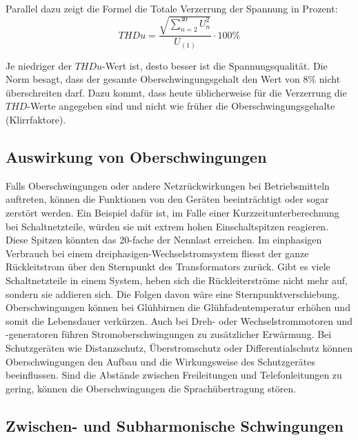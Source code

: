 Parallel dazu zeigt die Formel die Totale Verzerrung der Spannung in Prozent:
\begin{equation}\label{eq:THDu}
THDu = \frac{\sqrt{\sum_{n=2}^{40} U_n^2}}{U_{(1)}} \cdot 100\%
\end{equation}


Je niedriger der $THDu$-Wert ist, desto besser ist die Spannungsqualität. Die Norm besagt, dass der gesamte Oberschwingungsgehalt den Wert von 8\% nicht überschreiten darf. Dazu kommt, dass heute üblicherweise für die Verzerrung die $THD$-Werte angegeben sind und nicht wie früher die Oberschwingungsgehalte (Klirrfaktore).\\


\subsection{Auswirkung von Oberschwingungen}

Falls Oberschwingungen oder andere Netzrückwirkungen bei Betriebsmitteln auftreten, können die Funktionen von den Geräten beeinträchtigt oder sogar zerstört werden. Ein Beispiel dafür ist, im Falle einer Kurzzeitunterberechnung bei Schaltnetzteile, würden sie mit extrem hohen Einschaltspitzen reagieren. Diese Spitzen könnten das 20-fache der Nennlast erreichen. Im einphasigen Verbrauch bei einem dreiphasigen-Wechselstromsystem fliesst der ganze Rückleitstrom über den Sternpunkt des Transformators zurück. Gibt es viele Schaltnetzteile in einem System, heben sich die Rückleiterströme nicht mehr auf, sondern sie addieren sich. Die Folgen davon wäre eine Sternpunktverschiebung. Oberschwingungen können bei Glühbirnen die Glühfadentemperatur erhöhen und somit die Lebensdauer verkürzen. Auch bei Dreh- oder Wechselstrommotoren und -generatoren führen Stromoberschwingungen zu zusätzlicher Erwärmung. Bei Schutzgeräten wie Distanzschutz, Überstromschutz oder Differentialschutz können Oberschwingungen den Aufbau und die Wirkungsweise des Schutzgerätes beeinflussen. Sind die Abstände zwischen Freileitungen und Telefonleitungen zu gering, können die Oberschwingungen die Sprachübertragung stören.

\newpage
\subsection{Zwischen- und Subharmonische Schwingungen}

